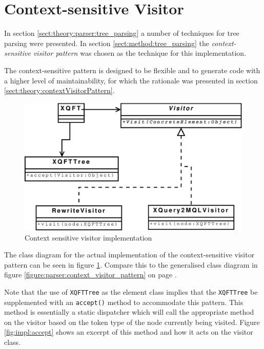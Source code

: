 \section{Context-sensitive Visitor}
\label{sect:impl:context_sens_visitor}
In section \ref{sect:theory:parser:tree_parsing} a number of techniques for
tree parsing were presented. In section \ref{sect:method:tree_parsing} the
\textit{context-sensitive visitor pattern} was chosen as the technique for this
implementation. 

The context-sensitive pattern is designed to be flexible and to generate code
with a higher level of maintainability, for which the rationale was presented
in section \ref{sect:theory:contextVisitorPattern}. 

\begin{figure}[htp]
\begin{center}
  \includegraphics[scale=0.5]{diagrams/context_visitor_pattern_impl}
  \caption{Context sensitive visitor implementation}
  \label{fig:impl:context_sens_visitor_impl}
\end{center}
\end{figure}

The class diagram for the actual implementation of the context-sensitive
visitor pattern can be seen in figure \ref{fig:impl:context_sens_visitor_impl}.
Compare this to the generalised class diagram in figure
\ref{figure:parser:context_visitor_pattern} on page
\pageref{figure:parser:context_visitor_pattern}.

Note that the use of \texttt{XQFTTree} as the element class implies that the
\texttt{XQFTTree} be supplemented with an \texttt{accept()} method to
accommodate this pattern. This method is essentially a static dispatcher which
will call the appropriate method on the visitor based on the token type of the
node currently being visited. Figure \ref{fig:impl:accept} shows an excerpt of this method and
how it acts on the visitor class.

